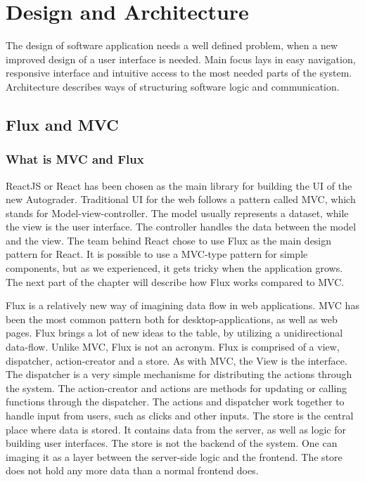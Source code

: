 \chapter{Design and Architecture}

The design of software application needs a well defined problem, when a new improved design of a user interface is needed. Main focus lays in easy navigation, responsive interface and intuitive access to the most needed parts of the system. Architecture describes ways of structuring software logic and communication.

\section{Flux and MVC}\label{sec:fluxmvc}
\subsection{What is MVC and Flux}
ReactJS or React has been chosen as the main library for building the UI of the new Autograder. Traditional UI for the web follows a pattern called MVC, which stands for Model-view-controller. The model usually represents a dataset, while the view is the user interface. The controller handles the data between the model and the view. The team behind React chose to use Flux as the main design pattern for React. It is possible to use a MVC-type pattern for simple components, but as we experienced, it gets tricky when the application grows. The next part of the chapter will describe how Flux works compared to MVC.

Flux is a relatively new way of imagining data flow in web applications. MVC has been the most common pattern both for desktop-applications, as well as web pages. Flux brings a lot of new ideas to the table, by utilizing a unidirectional data-flow. Unlike MVC, Flux is not an acronym. Flux is comprised of a view, dispatcher, action-creator and a store. As with MVC, the View is the interface. The dispatcher is a very simple mechanisme for distributing the actions through the system. The action-creator and actions are methods for updating or calling functions through the dispatcher. The actions and dispatcher work together to handle input from users, such as clicks and other inputs. The store is the central place where data is stored. It contains data from the server, as well as logic for building user interfaces. The store is not the backend of the system. One can imaging it as a layer between the server-side logic and the frontend. The store does not hold any more data than a normal frontend does.



